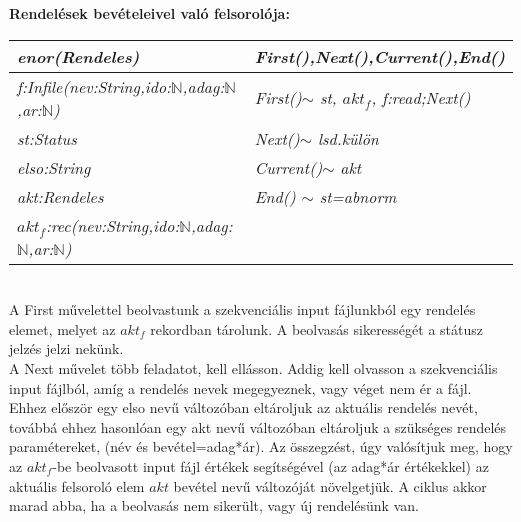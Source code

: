 \noindent\hfill
	\begin{stuki}[12cm]
		\begin{WHILE}{4}{}
			\begin{IF}[70]{2}{}
			\ELSE
			\end{IF}
		\end{WHILE}
	\end{stuki}
\vspace{5mm}
\textbf{Rendelések bevételeivel való felsorolója:}
\vspace{5mm}\\
	\begin{tabular}{|l|l|}
		\hline
		\textit{enor(Rendeles)}& \textit{First(),Next(),Current(),End()}\\
		\hline
		\textit{f:Infile(nev:String,ido:$\mathbb{N}$,adag:$\mathbb{N}$,ar:$\mathbb{N}$) }& \textit{First()$\sim$ st, $akt_f$, f:read;Next()}\\
		\textit{st:Status} & \textit{Next()$\sim$ lsd.külön}\\
		\textit{elso:String} & \textit{Current()$\sim$ akt}\\
		\textit{akt:Rendeles} & \textit{End() $\sim$ st=abnorm}\\
		\textit{$akt_f$:rec(nev:String,ido:$\mathbb{N}$,adag:$\mathbb{N}$,ar:$\mathbb{N}$)} & \\
		\hline
	\end{tabular}
\vspace{5mm}\\
\indent A First művelettel beolvastunk a szekvenciális input fájlunkból egy rendelés elemet, melyet az $akt_f$ rekordban tárolunk. A beolvasás sikerességét a státusz jelzés jelzi nekünk.\\
\indent A Next művelet több feladatot, kell ellásson. Addig kell olvasson a szekvenciális input fájlból, amíg a rendelés nevek megegyeznek, vagy véget nem ér a fájl. Ehhez először egy elso nevű változóban eltároljuk az aktuális rendelés nevét, továbbá ehhez hasonlóan egy akt nevű változóban eltároljuk a szükséges rendelés paramétereket, (név és bevétel=adag*ár). Az összegzést, úgy valósítjuk meg, hogy az $akt_f$-be beolvasott input fájl értékek segítségével (az adag*ár értékekkel) az aktuális felsoroló elem $akt$ bevétel nevű változóját növelgetjük. A ciklus akkor marad abba, ha a beolvasás nem sikerült, vagy új rendelésünk van.
